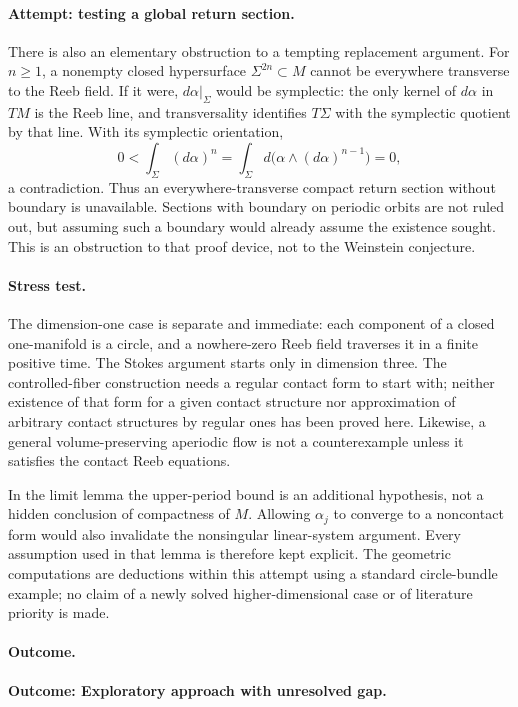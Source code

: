 \documentclass[11pt,a4paper]{article}
\numberwithin{equation}{section}
\begin{document}
\paragraph{Attempt: testing a global return section.}
There is also an elementary obstruction to a tempting replacement argument.
For $n\ge1$, a nonempty closed hypersurface $\Sigma^{2n}\subset M$ cannot
be everywhere transverse to the Reeb field. If it were, $d\alpha|_\Sigma$
would be symplectic: the only kernel of $d\alpha$ in $TM$ is the Reeb line,
and transversality identifies $T\Sigma$ with the symplectic quotient by
that line. With its symplectic orientation,
\[
 0<\int_\Sigma(d\alpha)^n
   =\int_\Sigma d\bigl(\alpha\wedge(d\alpha)^{n-1}\bigr)=0,
\]
a contradiction. Thus an everywhere-transverse compact return section
without boundary is unavailable. Sections with boundary on periodic orbits
are not ruled out, but assuming such a boundary would already assume the
existence sought. This is an obstruction to that proof device, not to the
Weinstein conjecture.

\paragraph{Stress test.}
The dimension-one case is separate and immediate: each component of a closed
one-manifold is a circle, and a nowhere-zero Reeb field traverses it in a
finite positive time. The Stokes argument starts only in dimension three.
The controlled-fiber construction needs a regular contact form to start
with; neither existence of that form for a given contact structure nor
approximation of arbitrary contact structures by regular ones has been
proved here. Likewise, a general volume-preserving aperiodic flow is not a
counterexample unless it satisfies the contact Reeb equations.

In the limit lemma the upper-period bound is an additional hypothesis, not
a hidden conclusion of compactness of $M$. Allowing $\alpha_j$ to converge
to a noncontact form would also invalidate the nonsingular linear-system
argument. Every assumption used in that lemma is therefore kept explicit.
The geometric computations are deductions within this attempt using a
standard circle-bundle example; no claim of a newly solved higher-dimensional
case or of literature priority is made.

\paragraph{Outcome.}
\textbf{Outcome: Exploratory approach with unresolved gap.}
\end{document}
